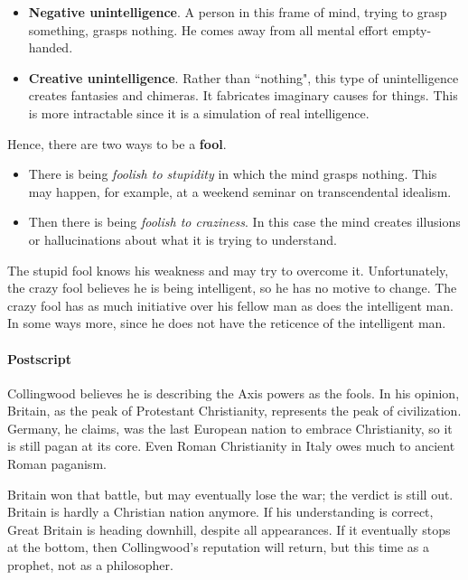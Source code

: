 \begin{itemize}
\item \textbf{Negative unintelligence}. A person in this frame of mind, trying to grasp something, grasps nothing. He comes away from all mental effort empty-handed. 
\item \textbf{Creative unintelligence}. Rather than ``nothing", this type of unintelligence creates fantasies and chimeras. It fabricates imaginary causes for things. This is more intractable since it is a simulation of real intelligence. 
\end{itemize}
Hence, there are two ways to be a \textbf{fool}.

\begin{itemize}
\item There is being \emph{foolish to stupidity} in which the mind grasps nothing. This may happen, for example, at a weekend seminar on transcendental idealism. 
\item Then there is being \emph{foolish to craziness}. In this case the mind creates illusions or hallucinations about what it is trying to understand. 
\end{itemize}
The stupid fool knows his weakness and may try to overcome it. Unfortunately, the crazy fool believes he is being intelligent, so he has no motive to change. The crazy fool has as much initiative over his fellow man as does the intelligent man. In some ways more, since he does not have the reticence of the intelligent man.

\paragraph{Postscript}
Collingwood believes he is describing the Axis powers as the fools. In his opinion, Britain, as the peak of Protestant Christianity, represents the peak of civilization. Germany, he claims, was the last European nation to embrace Christianity, so it is still pagan at its core. Even Roman Christianity in Italy owes much to ancient Roman paganism.

Britain won that battle, but may eventually lose the war; the verdict is still out. Britain is hardly a Christian nation anymore. If his understanding is correct, Great Britain is heading downhill, despite all appearances. If it eventually stops at the bottom, then Collingwood's reputation will return, but this time as a prophet, not as a philosopher.




